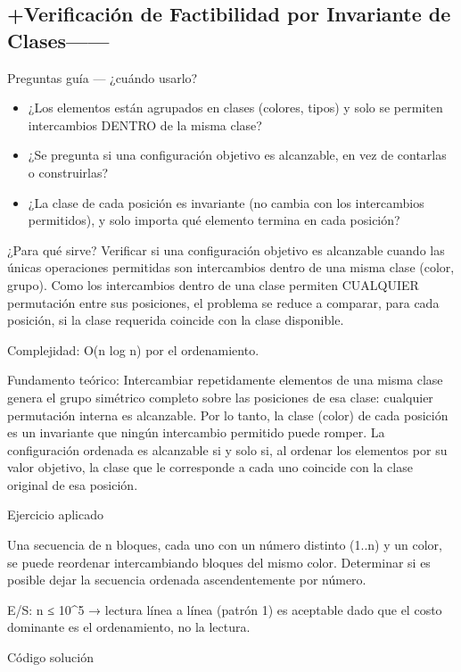 \subsection{+Verificación de Factibilidad por Invariante de Clases------}

Preguntas guía — ¿cuándo usarlo?

\begin{itemize}
\item ¿Los elementos están agrupados en clases (colores, tipos) y solo se permiten intercambios DENTRO de la misma clase?
\item ¿Se pregunta si una configuración objetivo es alcanzable, en vez de contarlas o construirlas?
\item ¿La clase de cada posición es invariante (no cambia con los intercambios permitidos), y solo importa qué elemento termina en cada posición?
\end{itemize}

¿Para qué sirve? Verificar si una configuración objetivo es alcanzable cuando las únicas operaciones permitidas son intercambios dentro de una misma clase (color, grupo). Como los intercambios dentro de una clase permiten CUALQUIER permutación entre sus posiciones, el problema se reduce a comparar, para cada posición, si la clase requerida coincide con la clase disponible.

Complejidad: O(n log n) por el ordenamiento.

Fundamento teórico: Intercambiar repetidamente elementos de una misma clase genera el grupo simétrico completo sobre las posiciones de esa clase: cualquier permutación interna es alcanzable. Por lo tanto, la clase (color) de cada posición es un invariante que ningún intercambio permitido puede romper. La configuración ordenada es alcanzable si y solo si, al ordenar los elementos por su valor objetivo, la clase que le corresponde a cada uno coincide con la clase original de esa posición.

Ejercicio aplicado

Una secuencia de n bloques, cada uno con un número distinto (1..n) y un color, se puede reordenar intercambiando bloques del mismo color. Determinar si es posible dejar la secuencia ordenada ascendentemente por número.

E/S: n ≤ 10\textasciicircum{}5 → lectura línea a línea (patrón 1) es aceptable dado que el costo dominante es el ordenamiento, no la lectura.

Código solución

